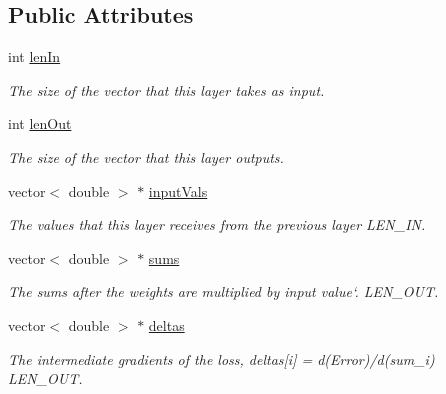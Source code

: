 \subsection*{Public Attributes}
\begin{DoxyCompactItemize}
\item 
int \hyperlink{classLayer_a5f699c67410ebc5acad98cc5d3a9b5ec}{len\+In}
\begin{DoxyCompactList}\small\item\em The size of the vector that this layer takes as input. \end{DoxyCompactList}\item 
\mbox{\label{classLayer_a57aa9a6491ea690f338f145c62a582f2}} 
int \hyperlink{classLayer_a57aa9a6491ea690f338f145c62a582f2}{len\+Out}
\begin{DoxyCompactList}\small\item\em The size of the vector that this layer outputs. \end{DoxyCompactList}\item 
\mbox{\label{classLayer_ab72e6e0db19cd376c3c62b59e5f55e56}} 
vector$<$ double $>$ $\ast$ \hyperlink{classLayer_ab72e6e0db19cd376c3c62b59e5f55e56}{input\+Vals}
\begin{DoxyCompactList}\small\item\em The values that this layer receives from the previous layer L\+E\+N\+\_\+\+IN. \end{DoxyCompactList}\item 
\mbox{\label{classLayer_a615b17469874e0f1d9a63236568c1be4}} 
vector$<$ double $>$ $\ast$ \hyperlink{classLayer_a615b17469874e0f1d9a63236568c1be4}{sums}
\begin{DoxyCompactList}\small\item\em The sums after the weights are multiplied by input value`. L\+E\+N\+\_\+\+O\+UT. \end{DoxyCompactList}\item 
\mbox{\label{classLayer_a6ba44600aedf6e90536cd76dc94562c0}} 
vector$<$ double $>$ $\ast$ \hyperlink{classLayer_a6ba44600aedf6e90536cd76dc94562c0}{deltas}
\begin{DoxyCompactList}\small\item\em The intermediate gradients of the loss, {\ttfamily deltas\mbox{[}i\mbox{]} = d(\+Error)/d(sum\+\_\+i)} L\+E\+N\+\_\+\+O\+UT. \end{DoxyCompactList}\item 

\end{DoxyCompactItemize}
